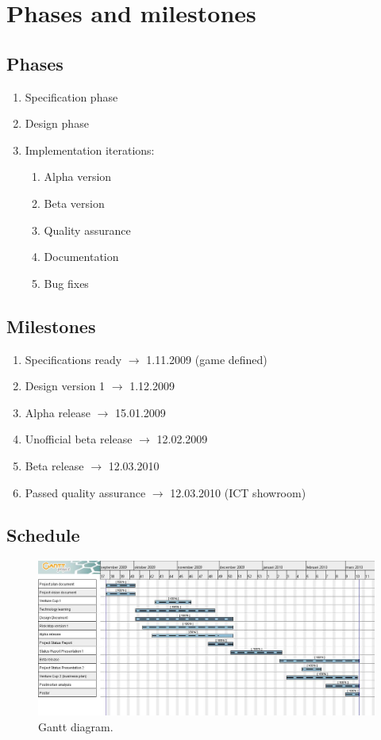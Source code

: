\documentclass[12pt,a4paper]{article}
\begin{document}
\section{Phases and milestones}

\subsection{Phases}
\begin{enumerate}
\item Specification phase
\item Design phase	
\item Implementation iterations:
\begin{enumerate}
\item Alpha version
\item Beta version
\item Quality assurance
\item Documentation
\item Bug fixes
\end{enumerate}
\end{enumerate}

\subsection{Milestones}

\begin{enumerate}
\item Specifications ready
	$\rightarrow$ 1.11.2009 (game defined)
\item Design version 1
	$\rightarrow$ 1.12.2009
\item Alpha release
	$\rightarrow$ 15.01.2009
\item Unofficial beta release
	$\rightarrow$ 12.02.2009 
\item Beta release
	$\rightarrow$ 12.03.2010
\item Passed quality assurance
	$\rightarrow$ 12.03.2010 (ICT  showroom)
\end{enumerate}

\subsection{Schedule}

\begin{figure}[h!]
\centering
\includegraphics[width=13cm]{pic/gantt.jpg}
\caption{Gantt diagram.}
\label{fig:ganttdia}
\end{figure}
\end{document}
